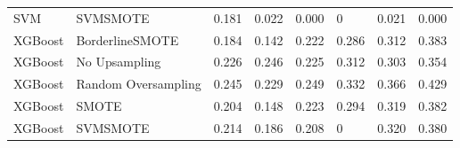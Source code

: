 \begin{tabular}{llllllll}
                            SVM &                      SVMSMOTE & 0.181 &                     0.022 &                 0.000 &                      0 &                                   0.021 &     0.000 \\
                        XGBoost &               BorderlineSMOTE & 0.184 &                     0.142 &                 0.222 &                  0.286 &                                   0.312 &     0.383 \\
                        XGBoost &                 No Upsampling & 0.226 &                     0.246 &                 0.225 &                  0.312 &                                   0.303 &     0.354 \\
                        XGBoost &           Random Oversampling & 0.245 &                     0.229 &                 0.249 &                  0.332 &                                   0.366 &     0.429 \\
                        XGBoost &                         SMOTE & 0.204 &                     0.148 &                 0.223 &                  0.294 &                                   0.319 &     0.382 \\
                        XGBoost &                      SVMSMOTE & 0.214 &                     0.186 &                 0.208 &                      0 &                                   0.320 &     0.380 \\
\bottomrule
\end{tabular}
